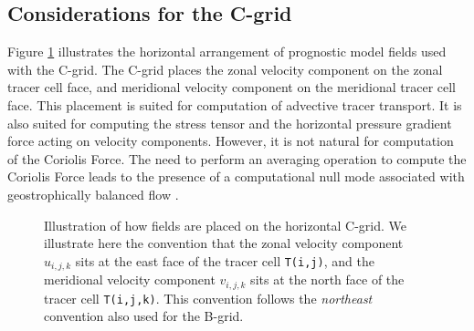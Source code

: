 \subsection{Considerations for the C-grid}
\label{subsection:c-grid-richardson-number}

Figure \ref{fig:c-grid} illustrates the horizontal arrangement of
prognostic model fields used with the C-grid. The C-grid places the
zonal velocity component on the zonal tracer cell face, and meridional
velocity component on the meridional tracer cell face.  This placement
is suited for computation of advective tracer transport.  It is also
suited for computing the stress tensor and the horizontal pressure
gradient force acting on velocity components.  However, it is not
natural for computation of the Coriolis Force.  The need to perform an
averaging operation to compute the Coriolis Force leads to the
presence of a computational null mode associated with geostrophically
balanced flow \citep{Adcroftetal1999}.

\begin{figure}
\begin{center}
\caption[Placement of fields onto the C-grid] {Illustration of how
  fields are placed on the horizontal C-grid.  We illustrate here the
  convention that the zonal velocity component $u_{i,j,k}$ sits at the
  east face of the tracer cell {\tt T(i,j)}, and the meridional
  velocity component $v_{i,j,k}$ sits at the north face of the tracer
  cell {\tt T(i,j,k)}.  This convention follows the {\it northeast}
  convention also used for the B-grid.}
\label{fig:c-grid}
\end{center}
\end{figure}


